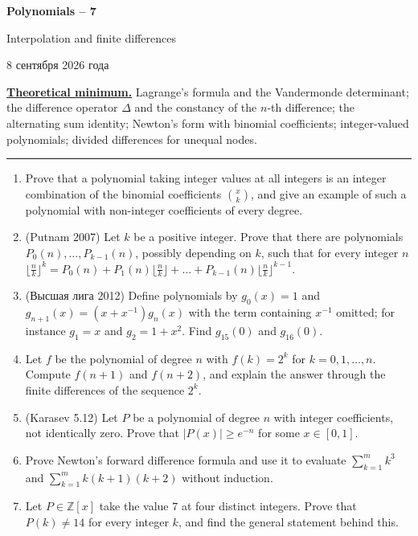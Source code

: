 \documentclass[11pt,a4paper]{article}
\renewcommand{\ge}{\geqslant}
\newcommand{\head}[1]{\par\medskip\noindent\textbf{\underline{#1}}\quad}
\newcommand{\sheettitle}[4]{%
  \begin{center}
  {\huge\bfseries #1\par}\vspace{1.2em}
  {\Large #2\par}\vspace{0.8em}
  \if\relax\detokenize{#3}\relax\else{\Large #3\par}\vspace{0.8em}\fi
  {\foreignlanguage{russian}{#4}\par}
  \end{center}\vspace{0.5em}}
\begin{document}
\sheettitle{Polynomials -- 7}{Interpolation and finite differences}{Homework}{8 сентября 2026 года}

\head{Theoretical minimum.} Lagrange's formula and the Vandermonde determinant; the difference
operator $\Delta$ and the constancy of the $n$-th difference; the alternating sum identity;
Newton's form with binomial coefficients; integer-valued polynomials; divided differences for
unequal nodes.

\medskip\noindent\rule{\linewidth}{0.4pt}

\begin{enumerate}[leftmargin=2.2em,itemsep=0.6em]
\item Prove that a polynomial taking integer values at all integers is an integer combination of
the binomial coefficients $\binom xk$, and give an example of such a polynomial with non-integer
coefficients of every degree.

\item (Putnam 2007) Let $k$ be a positive integer. Prove that there are polynomials
$P_0(n),\dots,P_{k-1}(n)$, possibly depending on $k$, such that for every integer $n$
$\bigl\lfloor\frac nk\bigr\rfloor^k=P_0(n)+P_1(n)\bigl\lfloor\frac nk\bigr\rfloor+\dots+P_{k-1}(n)\bigl\lfloor\frac nk\bigr\rfloor^{k-1}$.

\item (\foreignlanguage{russian}{Высшая лига} 2012) Define polynomials by $g_0(x)=1$ and
$g_{n+1}(x)=(x+x^{-1})g_n(x)$ with the term containing $x^{-1}$ omitted; for instance $g_1=x$ and
$g_2=1+x^2$. Find $g_{15}(0)$ and $g_{16}(0)$.

\item Let $f$ be the polynomial of degree $n$ with $f(k)=2^k$ for $k=0,1,\dots,n$. Compute
$f(n+1)$ and $f(n+2)$, and explain the answer through the finite differences of the sequence $2^k$.

\item (Karasev 5.12) Let $P$ be a polynomial of degree $n$ with integer coefficients, not
identically zero. Prove that $|P(x)|\ge e^{-n}$ for some $x\in[0,1]$.

\item Prove Newton's forward difference formula and use it to evaluate $\sum_{k=1}^mk^3$ and
$\sum_{k=1}^mk(k+1)(k+2)$ without induction.

\item Let $P\in\mathbb Z[x]$ take the value $7$ at four distinct integers. Prove that $P(k)\ne14$
for every integer $k$, and find the general statement behind this.


\end{enumerate}
\end{document}
